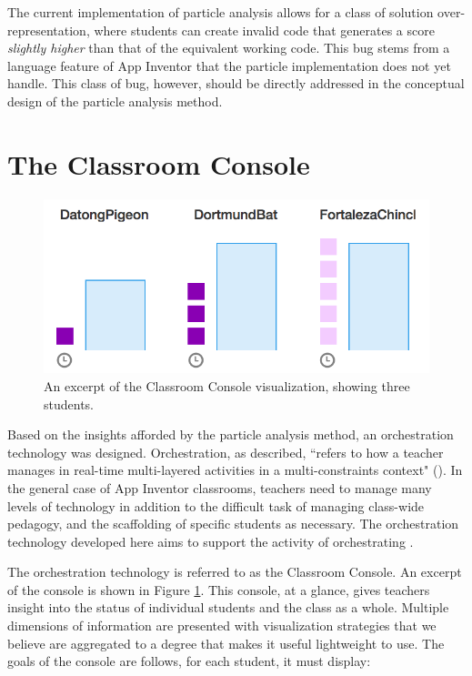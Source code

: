 The current implementation of particle analysis allows for a class of solution over-representation, where students can create invalid code that generates a score \emph{slightly higher} than that of the equivalent working code. This bug stems from a language feature of App Inventor that the particle implementation does not yet handle. This class of bug, however, should be directly addressed in the conceptual design of the particle analysis method.

\section{The Classroom Console}
\label{sec:classroom-console}

\begin{figure}
  \centering
      \includegraphics{images/ch4-console-demo}
  \caption[Excerpt of the Classroom Console]{An excerpt of the Classroom Console visualization, showing three students.}
  \label{fig:console-demo}
\end{figure}


Based on the insights afforded by the particle analysis method, an orchestration technology was designed. Orchestration, as \citeauthor{dillenbourg2012design} described, ``refers to how a teacher manages in real-time multi-layered activities in a multi-constraints context" (\citeyear{dillenbourg2012design}). In the general case of App Inventor classrooms, teachers need to manage many levels of technology in addition to the difficult task of managing class-wide pedagogy, and the scaffolding of specific students as necessary. The orchestration technology developed here aims to support the activity of orchestrating \citep{tchounikine2013clarifying}.

The orchestration technology is referred to as the Classroom Console. An excerpt of the console is shown in Figure \ref{fig:console-demo}. This console, at a glance, gives teachers insight into the status of individual students and the class as a whole. Multiple dimensions of information are presented with visualization strategies that we believe are aggregated to a degree that makes it useful lightweight to use. The goals of the console are follows, for each student, it must display:

